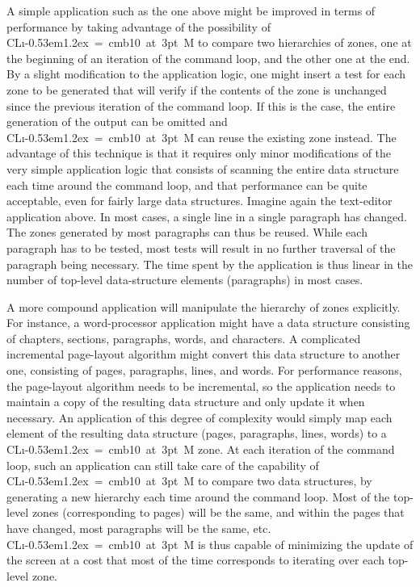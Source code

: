 \documentclass{report}
\def\Tiny{ \font\Tinyfont = cmb10 at 3pt \relax  \Tinyfont}
\def\clim{\textsf{CL{\i}\kern-0.53em\raise1.2ex\hbox{\Tiny 3}M}}
\begin{document}
A simple application such as the one above might be improved in terms
of performance by taking advantage of the possibility of \clim{} to
compare two hierarchies of zones, one at the beginning of an
iteration of the command loop, and the other one at the end.  By
a slight modification to the application logic, one might insert a
test for each zone to be generated that will verify if the contents
of the zone is unchanged since the previous iteration of the command
loop.  If this is the case, the entire generation of the output can be
omitted and \clim{} can reuse the existing zone instead.  The
advantage of this technique is that it requires only minor
modifications of the very simple application logic that consists of
scanning the entire data structure each time around the command loop,
and that performance can be quite acceptable, even for fairly large
data structures.  Imagine again the text-editor application above.  In
most cases, a single line in a single paragraph has changed.  The
zones generated by most paragraphs can thus be reused.  While each
paragraph has to be tested, most tests will result in no further
traversal of the paragraph being necessary.  The time spent by the
application is thus linear in the number of top-level data-structure
elements (paragraphs) in most cases.  

A more compound application will manipulate the hierarchy of zones
explicitly.  For instance, a word-processor application might have a
data structure consisting of chapters, sections, paragraphs, words,
and characters.  A complicated incremental page-layout algorithm might
convert this data structure to another one, consisting of pages,
paragraphs, lines, and words.  For performance reasons, the
page-layout algorithm needs to be incremental, so the application
needs to maintain a copy of the resulting data structure and only
update it when necessary.  An application of this degree of complexity
would simply map each element of the resulting data structure (pages,
paragraphs, lines, words) to a \clim{} zone.  At each iteration of
the command loop, such an application can still take care of the
capability of \clim{} to compare two data structures, by generating a
new hierarchy each time around the command loop.  Most of the
top-level zones (corresponding to pages) will be the same, and
within the pages that have changed, most paragraphs will be the same,
etc.  \clim{} is thus capable of minimizing the update of the screen at
a cost that most of the time corresponds to iterating over each
top-level zone. 
\end{document}
